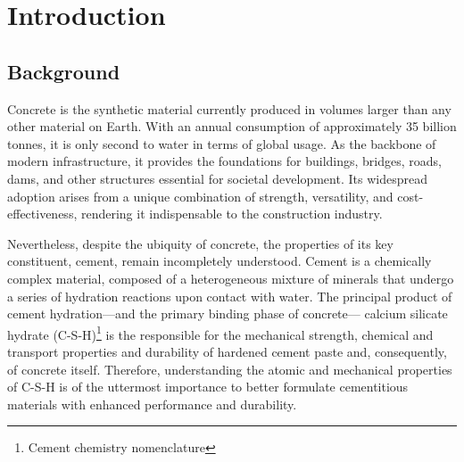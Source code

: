 
\chapter{Introduction} %

\label{Chapter1} %



\section{Background}
  Concrete is the synthetic material currently produced in volumes larger than any other material on Earth. With an annual consumption of approximately 35 billion tonnes, it is only second to water in terms of global usage\supercite{Monteiro2017, VanDamme2018}. As the backbone of modern infrastructure, it provides the foundations for buildings, bridges, roads, dams, and other structures essential for societal development. Its widespread adoption arises from a unique combination of strength, versatility, and cost-effectiveness\supercite{Mehta2014}, rendering it indispensable to the construction industry.

  Nevertheless, despite the ubiquity of concrete, the properties of its key constituent, cement, remain incompletely understood. Cement is a chemically complex material, composed of a heterogeneous mixture of minerals that undergo a series of hydration reactions upon contact with water. The principal product of cement hydration---and the primary binding phase of concrete--- calcium silicate hydrate (C-S-H)\footnote{Cement chemistry nomenclature} is the responsible for the mechanical strength, chemical and transport properties and durability of hardened cement paste and, consequently, of concrete itself\supercite{Papatzani2015, Ioannidou2016, Qomi2020, Bahraq2022}. Therefore, understanding the atomic and mechanical properties of C-S-H is of the uttermost importance to better formulate cementitious materials with enhanced performance and durability.\supercite{Foley2012}



